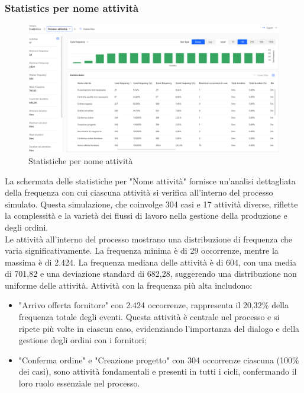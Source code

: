 \documentclass{article}
\begin{document}
\subsubsection{Statistics per nome attività}
\begin{figure}[H]
    \centering
    \includegraphics[width=\textwidth]{imgMicrosoft/TerzaSimulazione/StatisticsNomeAttivitaSimulazione3.png}
    \caption{Statistiche per nome attività}
    \label{fig:statistics-nome-attività}
\end{figure}
La schermata delle statistiche per "Nome attività" fornisce un'analisi dettagliata della frequenza con cui ciascuna attività si verifica all'interno del processo simulato. Questa simulazione, che coinvolge 304 casi e 17 attività diverse, riflette la complessità e la varietà dei flussi di lavoro nella gestione della produzione e degli ordini.\\
Le attività all'interno del processo mostrano una distribuzione di frequenza che varia significativamente. La frequenza minima è di 29 occorrenze, mentre la massima è di 2.424. La frequenza mediana delle attività è di 604, con una media di 701,82 e una deviazione standard di 682,28, suggerendo una distribuzione non uniforme delle attività. Attività con la frequenza più alta includono:
\begin{itemize}
    \item "Arrivo offerta fornitore" con 2.424 occorrenze, rappresenta il 20,32\% della frequenza totale degli eventi. Questa attività è centrale nel processo e si ripete più volte in ciascun caso, evidenziando l'importanza del dialogo e della gestione degli ordini con i fornitori;
    \item "Conferma ordine" e "Creazione progetto" con 304 occorrenze ciascuna (100\% dei casi), sono attività fondamentali e presenti in tutti i cicli, confermando il loro ruolo essenziale nel processo.
\end{itemize}
\end{document}
